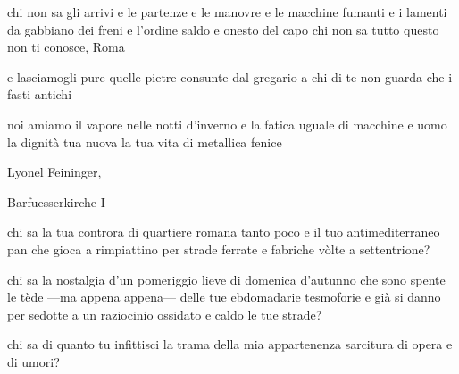 \clearpage


\begin{poem}
	\begin{stanza}
		chi non sa gli arrivi e le partenze\verseline
		e le manovre e le macchine fumanti\verseline
		e i lamenti da gabbiano dei freni\verseline
		e l'ordine saldo e onesto del capo\verseline
		chi non sa tutto questo\verseline
		non ti conosce, Roma
	\end{stanza}

	\begin{stanza}
		e lasciamogli pure quelle pietre\verseline
		consunte dal gregario\verseline
		a chi di te non guarda\verseline
		che i fasti antichi
	\end{stanza}

	\begin{stanza}
		noi amiamo il vapore nelle notti d'inverno\verseline
		e la fatica uguale di macchine e uomo\verseline
		la dignità tua nuova\verseline
		la tua vita di metallica fenice
	\end{stanza}
\end{poem}

\clearpage


\begin{artItem}
	Lyonel Feininger, \begin{otherlanguage}{german}%
		Barfuesserkirche I%
	\end{otherlanguage}
\end{artItem}

\begin{poem}
	\begin{stanza}
		chi sa la tua controra di quartiere\verseline
		romana tanto poco e il tuo\verseline
		antimediterraneo pan\verseline
		che gioca a rimpiattino\verseline
		per strade ferrate e fabriche\verseline
		vòlte a settentrione?
	\end{stanza}

	\begin{stanza}
		chi sa la nostalgia d'un pomeriggio\verseline
		lieve di domenica d'autunno\verseline
		che sono spente le tède\verseline
		—ma appena appena—\verseline
		delle tue ebdomadarie tesmoforie\verseline
		e già si danno per sedotte\verseline
		a un raziocinio ossidato e caldo\verseline
		le tue strade?
	\end{stanza}

	\begin{stanza}
		chi sa di quanto tu infittisci\verseline
		la trama della mia appartenenza\verseline
		sarcitura di opera e di umori?
	\end{stanza}
\end{poem}


